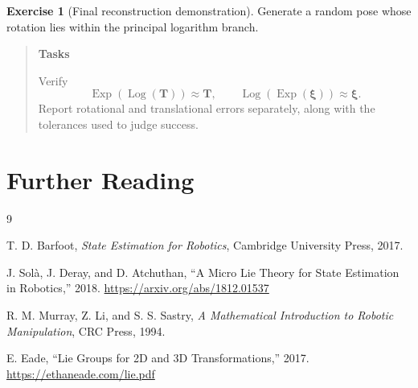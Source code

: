 \documentclass[10pt,a4paper]{article}
\numberwithin{equation}{section}
\newcommand{\Section}[1]{\section{#1}}
\newcommand{\Exp}{\operatorname{Exp}}
\newcommand{\Log}{\operatorname{Log}}
\newcommand{\vect}[1]{\boldsymbol{#1}}
\theoremstyle{definition}
\theoremstyle{exercisestyle}
\newtheorem{exercise}{Exercise}[section]
\newenvironment{tasks}
    {\par\begin{quote}\small\textbf{Tasks}\par\smallskip}
    {\end{quote}}
\begin{document}
\begin{exercise}[Final reconstruction demonstration]
Generate a random pose whose rotation lies within the principal logarithm
branch.
\begin{tasks}
Verify
\[
    \Exp(\Log(\mathbf{T}))\approx\mathbf{T},
    \qquad
    \Log(\Exp(\vect{\xi}))\approx\vect{\xi}.
\]
Report rotational and translational errors separately, along with the
tolerances used to judge success.
\end{tasks}
\end{exercise}


\Section{Further Reading}

\begin{thebibliography}{9}

    T. D. Barfoot,
    \emph{State Estimation for Robotics},
    Cambridge University Press, 2017.

    J. Sol\`a, J. Deray, and D. Atchuthan,
    ``A Micro Lie Theory for State Estimation in Robotics,''
    2018. \url{https://arxiv.org/abs/1812.01537}

    R. M. Murray, Z. Li, and S. S. Sastry,
    \emph{A Mathematical Introduction to Robotic Manipulation},
    CRC Press, 1994.

    E. Eade,
    ``Lie Groups for 2D and 3D Transformations,''
    2017. \url{https://ethaneade.com/lie.pdf}

\end{thebibliography}
\end{document}
